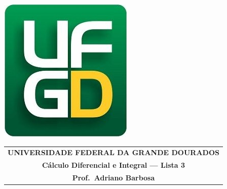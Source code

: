 \documentclass[a4paper,5pt]{amsbook}
\begin{document}
\thispagestyle{empty}
\pagestyle{empty}
\begin{minipage}[h]{0.14\textwidth}
	\includegraphics[scale=0.24]{../ufgd.png}
\end{minipage}
\begin{minipage}[h]{\textwidth}
\begin{tabular}{c}
{{\bf UNIVERSIDADE FEDERAL DA GRANDE DOURADOS}}\\
{{\bf C\'alculo Diferencial e Integral --- Lista 3}}\\
{{\bf Prof.\ Adriano Barbosa}}\\
\end{tabular}
\vspace{-0.45cm}
%
\end{minipage}

\end{document}

